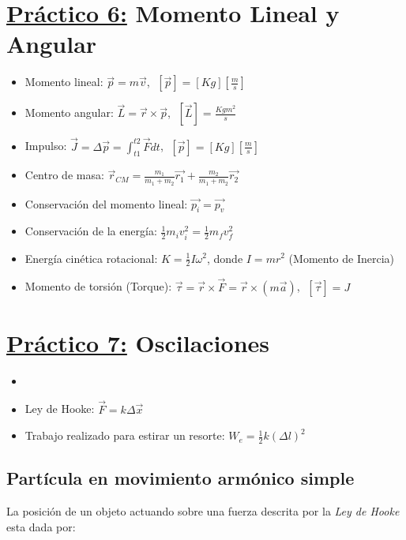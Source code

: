 \documentclass[12pt,a4paper]{article}
\newcommand{\PN}{\par\noindent}
\begin{document}
	\section*{\underline{Práctico 6:} Momento Lineal y Angular}
		\begin{multicols}{2}
			\begin{itemize}
				\item Momento lineal: $\vec{p} = m \vec{v}$, $\; [\vec{p}] = [Kg] [\frac{m}{s}]$
				\item Momento angular: $\vec{L} = \vec{r} \times \vec{p}$, $\; [\vec{L}] = \frac{Kg m^{2}}{s}$
				\item Impulso: $\vec{J} = \Delta \vec{p} = \int_{t1}^{t2} \vec{F} dt$, $\; [\vec{p}] = [Kg] [\frac{m}{s}]$
				\item Centro de masa: $\vec{r}_{CM} = \frac{m_{1}}{m_{1} + m_{2}} \vec{r_{1}} + \frac{m_{2}}{m_{1} + m_{2}}
					\vec{r_{2}}$
				\item Conservación del momento lineal: $\vec{p_{i}} = \vec{p_{v}}$
				\item Conservación de la energía: $\frac{1}{2} m_{i} v_{i}^{2} = \frac{1}{2} m_{f} v_{f}^{2}$
				\item Energía cinética rotacional: $K = \frac{1}{2} I \omega^{2}$, donde $I = m r^{2}$ (Momento de Inercia)
				\item Momento de torsión (Torque): $\vec{\tau} = \vec{r} \times \vec{F} = \vec{r} \times (m\vec{a})$, $\; [\vec{\tau}] = J$
			\end{itemize}
		\end{multicols}

	\section*{\underline{Práctico 7:} Oscilaciones}
		\begin{itemize}
			\item
			\item Ley de Hooke: $\vec{F} = k \Delta \vec{x}$
			\item Trabajo realizado para estirar un resorte: $W_{e} = \frac{1}{2} k (\Delta l)^{2}$
		\end{itemize}

	\subsection{Partícula en movimiento armónico simple}
		\PN La posición de un objeto actuando sobre una fuerza descrita por la \textit{Ley de Hooke} esta dada por:
		\begin{equation}
		\end{equation}
\end{document}
